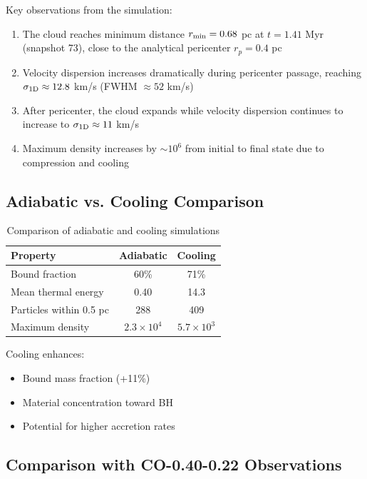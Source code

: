 \documentclass[twocolumn,amsmath,amssymb,prd,superscriptaddress,nofootinbib]{revtex4-2}
\begin{document}
Key observations from the simulation:
\begin{enumerate}
    \item The cloud reaches minimum distance $r_{\rm min} = 0.68$ pc at $t = 1.41$ Myr (snapshot 73), close to the analytical pericenter $r_p = 0.4$ pc
    \item Velocity dispersion increases dramatically during pericenter passage, reaching $\sigma_{\rm 1D} \approx 12.8$ km/s (FWHM $\approx 52$ km/s)
    \item After pericenter, the cloud expands while velocity dispersion continues to increase to $\sigma_{\rm 1D} \approx 11$ km/s
    \item Maximum density increases by $\sim 10^6$ from initial to final state due to compression and cooling
\end{enumerate}

\subsection{Adiabatic vs. Cooling Comparison}
\label{sec:cooling}

\begin{table}[h]
\centering
\caption{Comparison of adiabatic and cooling simulations}
\label{tab:cooling}
\begin{tabular}{lcc}
\toprule
Property & Adiabatic & Cooling \\
\midrule
Bound fraction & 60\% & 71\% \\
Mean thermal energy & 0.40 & 14.3 \\
Particles within 0.5 pc & 288 & 409 \\
Maximum density & $2.3\times 10^4$ & $5.7\times 10^3$ \\
\bottomrule
\end{tabular}
\end{table}

Cooling enhances:
\begin{itemize}
    \item Bound mass fraction (+11\%)
    \item Material concentration toward BH
    \item Potential for higher accretion rates
\end{itemize}

\subsection{Comparison with CO-0.40-0.22 Observations}
\label{sec:co0.40}
\end{document}
